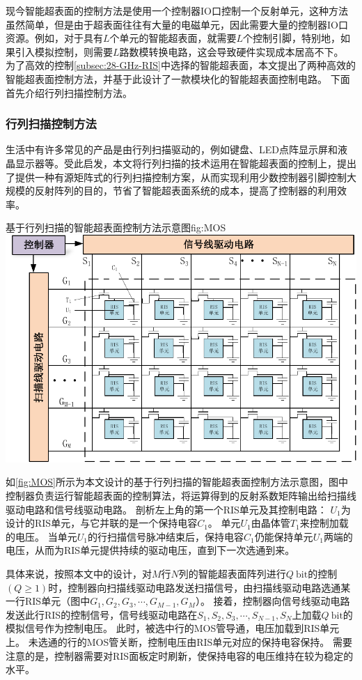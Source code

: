 \documentclass[supercite]{HustGraduPaper}
\begin{document}
现今智能超表面的控制方法是使用一个控制器IO口控制一个反射单元，这种方法虽然简单，但是由于超表面往往有大量的电磁单元，因此需要大量的控制器IO口资源。例如，对于具有$L$个单元的智能超表面，就需要$L$个控制引脚，特别地，如果引入模拟控制，则需要$L$路数模转换电路，这会导致硬件实现成本居高不下。
为了高效的控制\autoref{subsec:28-GHz-RIS}中选择的智能超表面，本文提出了两种高效的智能超表面控制方法，并基于此设计了一款模块化的智能超表面控制电路。
下面首先介绍行列扫描控制方法。

\subsubsection{行列扫描控制方法}

生活中有许多常见的产品是由行列扫描驱动的，例如键盘、LED点阵显示屏和液晶显示器等。受此启发，本文将行列扫描的技术运用在智能超表面的控制上，提出了提供一种有源矩阵式的行列扫描控制方案，从而实现利用少数控制器引脚控制大规模的反射阵列的目的，节省了智能超表面系统的成本，提高了控制器的利用效率。

\begin{generalfig}[htb]{基于行列扫描的智能超表面控制方法示意图}{fig:MOS}
	\includegraphics[width=0.8\linewidth]{Figures/MOS.pdf}
\end{generalfig}
如\autoref{fig:MOS}所示为本文设计的基于行列扫描的智能超表面控制方法示意图，图中控制器负责运行智能超表面的控制算法，将运算得到的反射系数矩阵输出给扫描线驱动电路和信号线驱动电路。
剖析左上角的第一个RIS单元及其控制电路：
$U_1$为设计的RIS单元，与它并联的是一个保持电容$C_1$。
单元$U_1$由晶体管$T_1$来控制加载的电压。
当单元$U_1$的行扫描信号脉冲结束后，保持电容$C_1$仍能保持单元$U_1$两端的电压，从而为RIS单元提供持续的驱动电压，直到下一次选通到来。

具体来说，按照本文中的设计，对$M$行$N$列的智能超表面阵列进行$Q ~ \mathrm{bit}$的控制$(Q \ge 1)$时，控制器向扫描线驱动电路发送扫描信号，由扫描线驱动电路选通某一行RIS单元（图中$G_1,G_2,G_3,\cdots,G_{M-1},G_M$）。
接着，控制器向信号线驱动电路发送此行RIS的控制信号，信号线驱动电路在$S_1,S_2,S_3,\cdots,S_{N-1},S_N$上加载$Q ~ \mathrm{bit}$的模拟信号作为控制电压。
此时，被选中行的MOS管导通，电压加载到RIS单元上。
未选通的行的MOS管关断，控制电压由RIS单元对应的保持电容保持。
需要注意的是，控制器需要对RIS面板定时刷新，使保持电容的电压维持在较为稳定的水平。
\end{document}
